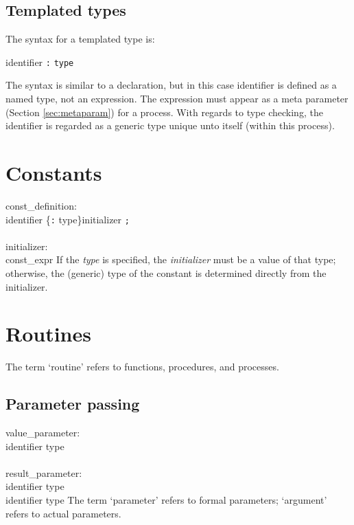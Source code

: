 \subsection{Templated types}\label{sec:template}

The syntax for a templated type is:

\grammarstart
      \>identifier {\tt{}:} {\tt{}type}
\grammarend

The syntax is similar to a declaration, but in this case identifier is defined as a
named type, not an expression.  The expression must appear as a meta parameter
(Section \ref{sec:metaparam}) for a process.  With regards to type checking, the
identifier is regarded as a generic type unique unto itself (within this process).


\section{Constants}\label{sec:const}

\grammarstart
const\_definition: \\
       identifier \{{\tt{}:} type\}\OPT initializer {\tt{};} \\
 \\
initializer: \\
      \>{\tt{}=} const\_expr
\grammarend
If the {\it{}type} is specified, the {\it{}initializer} must be a value of that type;
otherwise, the (generic) type of the constant is determined directly
from the initializer.



\section{Routines}\label{sec:routines}

The term `routine' refers to functions, procedures, and processes.

\subsection{Parameter passing}\label{sec:parameters}

\grammarstart
value\_parameter: \\
      \OPT identifier\LIST {\tt{}:} type \\
 \\
result\_parameter: \\
        identifier\LIST {\tt{}:} type \\
\orbox {} identifier\LIST {\tt{}:} type
\grammarend
The term `parameter' refers to formal parameters; `argument' refers to
actual parameters.


